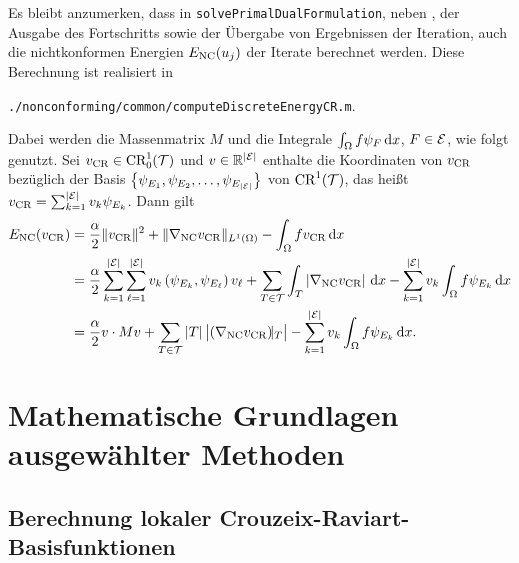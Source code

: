 Es bleibt anzumerken, dass in \texttt{solvePrimalDualFormulation}, neben 
, der Ausgabe des Fortschritts sowie
der Übergabe von Ergebnissen der Iteration, auch die
nichtkonformen Energien $E_\textup{NC}(u_j)$ der Iterate berechnet werden. 
Diese Berechnung ist realisiert in
\begin{center}
  \texttt{./nonconforming/common/computeDiscreteEnergyCR.m}.
\end{center}
Dabei werden die Massenmatrix $M$ und die Integrale 
$\int_\Omega f\psi_{F}\,\mathrm{d}x$, $F\in\mathcal{E}$, wie folgt genutzt.
Sei $v_\textup{CR}\in\textup{CR}^1_0(\mathcal{T})$ und $v\in\mathbb{R}^{|\mathcal{E}|}$
enthalte die Koordinaten von $v_\textup{CR}$ bezüglich der Basis
$\left\{\psi_{E_1},\psi_{E_2},\ldots,\psi_{E_{|\mathcal{E}|}}\right\}$
von $\textup{CR}^1(\mathcal{T})$, das heißt
$v_\textup{CR}=\sum_{k=1}^{|\mathcal{E}|}v_k \psi_{E_k}$.
Dann gilt
\begin{align*}
  E_\textup{NC}(v_\textup{CR})
  &=
  \frac{\alpha}{2}\Vert v_\textup{CR}\Vert^2
  + \Vert\nabla_\textup{NC} v_\textup{CR}\Vert_{L^1(\Omega)}
  -\int_\Omega fv_\textup{CR}\,\mathrm{d}x\\
  &=
  \frac{\alpha}{2}
  \sum_{k=1}^{|\mathcal{E}|} 
  \sum_{\ell=1}^{|\mathcal{E}|} 
  v_k\left( \psi_{E_k}, \psi_{E_\ell} \right)v_\ell
  + \sum_{T\in\mathcal{T}}
   \int_T\left|\nabla_\textup{NC} v_\textup{CR}\right|\,\mathrm{d}x
  -\sum_{k=1}^{|\mathcal{E}|}v_k\int_\Omega f\psi_{E_k}\,\mathrm{d}x\\
  &=
  \frac{\alpha}{2} v\cdot Mv
  + \sum_{T\in\mathcal{T}}|T|\, \big|\!\left(\nabla_\textup{NC} v_\textup{CR}\right)\!\!|_T\big|
  -\sum_{k=1}^{|\mathcal{E}|}v_k\int_\Omega f\psi_{E_k}\,\mathrm{d}x.
\end{align*}


\section{Mathematische Grundlagen ausgewählter Methoden}
\label{sec:mathematicalBasicsForMethods}


\subsection{Berechnung lokaler Crouzeix-Raviart-Basisfunktionen}
\label{sec:localCRBasisRealization}

